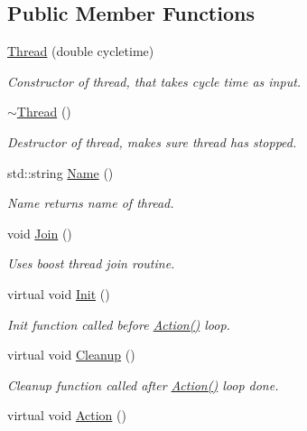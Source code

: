 \subsection*{Public Member Functions}
\begin{DoxyCompactItemize}
\item 
\hyperlink{classRCS_1_1Thread_a3f5e86f11c0b8fc3aa4728549b1b7249}{Thread} (double cycletime)
\begin{DoxyCompactList}\small\item\em Constructor of thread, that takes cycle time as input. \end{DoxyCompactList}\item 
\hyperlink{classRCS_1_1Thread_a7b91358afd5f9609b3a6b5b32f9a89aa}{$\sim$\-Thread} ()
\begin{DoxyCompactList}\small\item\em Destructor of thread, makes sure thread has stopped. \end{DoxyCompactList}\item 
std\-::string \hyperlink{classRCS_1_1Thread_abacaaba20a73fe57440d60bf4f4f458b}{Name} ()
\begin{DoxyCompactList}\small\item\em Name returns name of thread. \end{DoxyCompactList}\item 
void \hyperlink{classRCS_1_1Thread_a5f7209d2edfa23588f6adc74bbfb8f07}{Join} ()
\begin{DoxyCompactList}\small\item\em Uses boost thread join routine. \end{DoxyCompactList}\item 
virtual void \hyperlink{classRCS_1_1Thread_a53ee19c04d064c9a23f0909cf9a4b2cc}{Init} ()
\begin{DoxyCompactList}\small\item\em Init function called before \hyperlink{classRCS_1_1Thread_a327655d2626c51ea61bcc233a94dc78e}{Action()} loop. \end{DoxyCompactList}\item 
virtual void \hyperlink{classRCS_1_1Thread_a8b932e4130f18d9747407fe70a87332a}{Cleanup} ()
\begin{DoxyCompactList}\small\item\em Cleanup function called after \hyperlink{classRCS_1_1Thread_a327655d2626c51ea61bcc233a94dc78e}{Action()} loop done. \end{DoxyCompactList}\item 
virtual void \hyperlink{classRCS_1_1Thread_a327655d2626c51ea61bcc233a94dc78e}{Action} ()

\end{DoxyCompactItemize}

